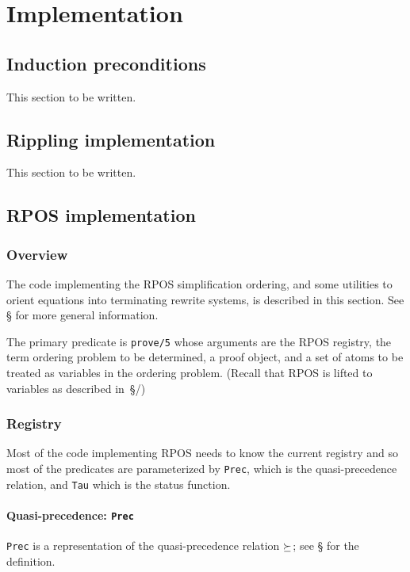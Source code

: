 \chapter {Implementation}

\section {Induction preconditions}
This section to be written.


\section {Rippling implementation}
This section to be written.



\section {RPOS implementation}




\subsection {Overview}
The code implementing the RPOS simplification ordering, and some
utilities to orient equations into terminating rewrite systems, is
described in this section.  See \S{} for more
general information.



The primary predicate is {\tt prove/5} whose arguments are the RPOS
registry, the term ordering problem to be determined, a proof object,
and a set of atoms to be treated as variables in the ordering problem.
(Recall that RPOS is lifted to variables as described
in~\S{}/)

\subsection {Registry}

Most of the code implementing RPOS needs to know the current registry
and so most of the predicates are parameterized by {\tt Prec}, which
is the quasi-precedence relation, and {\tt Tau} which is the status
function.

\subsubsection {Quasi-precedence: {\tt Prec}}
\label{quasi-imp}
{\tt Prec} is a representation of the quasi-precedence relation
$\succeq$; see \S{} for the definition.

